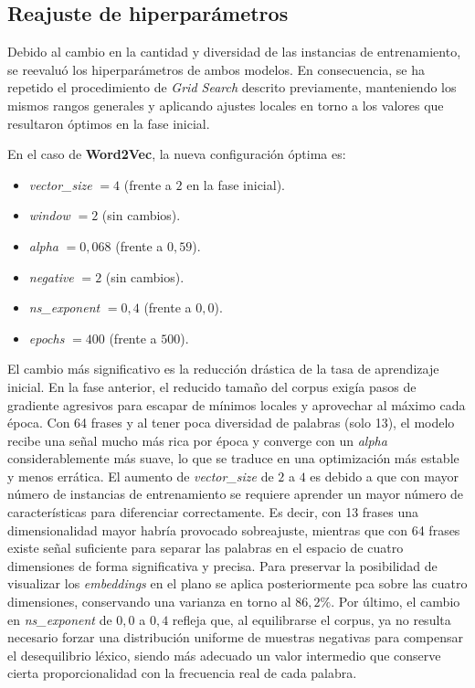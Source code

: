 \subsection{Reajuste de hiperparámetros}

Debido al cambio en la cantidad y diversidad de las instancias de entrenamiento, se reevaluó los hiperparámetros de ambos modelos. En consecuencia, se ha repetido el procedimiento de \textit{Grid Search} descrito previamente, manteniendo los mismos rangos generales y aplicando ajustes locales en torno a los valores que resultaron óptimos en la fase inicial.

En el caso de \textbf{Word2Vec}, la nueva configuración óptima es:

\begin{itemize}
  \item \textit{vector\_size} $= 4$ (frente a $2$ en la fase inicial).
  \item \textit{window} $= 2$ (sin cambios).
  \item \textit{alpha} $= 0{,}068$ (frente a $0{,}59$).
  \item \textit{negative} $= 2$ (sin cambios).
  \item \textit{ns\_exponent} $= 0{,}4$ (frente a $0{,}0$).
  \item \textit{epochs} $= 400$ (frente a $500$).
\end{itemize}

El cambio más significativo es la reducción drástica de la tasa de aprendizaje inicial. En la fase anterior, el reducido tamaño del corpus exigía pasos de gradiente agresivos para escapar de mínimos locales y aprovechar al máximo cada época. Con 64 frases y al tener poca diversidad de palabras (solo 13), el modelo recibe una señal mucho más rica por época y converge con un \textit{alpha} considerablemente más suave, lo que se traduce en una optimización más estable y menos errática. El aumento de \textit{vector\_size} de $2$ a $4$ es debido a que con mayor número de instancias de entrenamiento se requiere aprender un mayor número de características para diferenciar correctamente. Es decir, con 13 frases una dimensionalidad mayor habría provocado sobreajuste, mientras que con 64 frases existe señal suficiente para separar las palabras en el espacio de cuatro dimensiones de forma significativa y precisa. Para preservar la posibilidad de visualizar los \textit{embeddings} en el plano se aplica posteriormente \gls{pca} sobre las cuatro dimensiones, conservando una varianza en torno al $86,2\%$. Por último, el cambio en \textit{ns\_exponent} de $0{,}0$ a $0{,}4$ refleja que, al equilibrarse el corpus, ya no resulta necesario forzar una distribución uniforme de muestras negativas para compensar el desequilibrio léxico, siendo más adecuado un valor intermedio que conserve cierta proporcionalidad con la frecuencia real de cada palabra.


